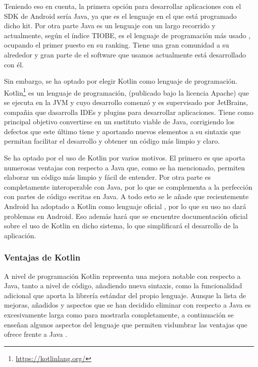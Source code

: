 Teniendo eso en cuenta, la primera opción para desarrollar aplicaciones con el SDK de Android sería Java, ya que es el lenguaje en el que está programado dicho kit. Por otra parte Java es un lenguaje con un largo recorrido y actualmente, según el índice TIOBE, es el lenguaje de programación más usado \cite{tiobe}, ocupando el primer puesto en su ranking. Tiene una gran comunidad a su alrededor y gran parte de el software que usamos actualmente está desarrollado con él.

Sin embargo, se ha optado por elegir Kotlin como lenguaje de programación. Kotlin\footnote{\url{https://kotlinlang.org/}} es un lenguaje de programación, (publicado bajo la licencia Apache) que se ejecuta en la JVM y cuyo desarrollo comenzó y es supervisado por JetBrains, compañia que dasarrolla IDEs y plugins para desarrollar aplicaciones. Tiene como principal objetivo convertirse en un sustituto viable de Java, corrigiendo los defectos que este último tiene y aportando nuevos elementos a su sintaxis que permitan facilitar el desarrollo y obtener un código más limpio y claro.

Se ha optado por el uso de Kotlin por varios motivos. El primero es que aporta numerosas ventajas con respecto a Java que, como se ha mencionado, permiten elaborar un código más limpio y fácil de entender. Por otra parte es completamente interoperable con Java, por lo que se complementa a la perfección con partes de código escritas en Java. A todo esto se le añade que recientemente Android ha adoptado a Kotlin como lenguaje oficial \cite{kotlin-android}, por lo que su uso no dará problemas en Android. Eso además hará que se encuentre documentación oficial sobre el uso de Kotlin en dicho sistema, lo que simplificará el desarrollo de la aplicación.

\subsubsection{Ventajas de Kotlin}

A nivel de programación Kotlin representa una mejora notable con respecto a Java, tanto a nivel de código, añadiendo nueva sintaxis, como la funcionalidad adicional que aporta la librería estándar del propio lenguaje. Aunque la lista de mejoras, añadidos y aspectos que se han decidido eliminar con respecto a Java es excesivamente larga como para mostrarla completamente, a continuación se enseñan algunos aspectos del lenguaje que permiten vislumbrar las ventajas que ofrece frente a Java \cite{kotlin-vs-java}.

